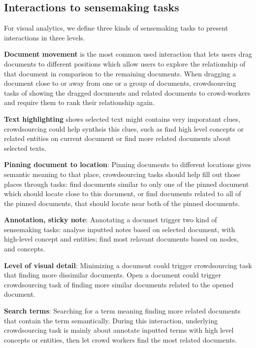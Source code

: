 \documentclass[journal]{vgtc}                %
\begin{document}
\subsection{Interactions to sensemaking tasks}

For visual analytics, we define three kinds of sensemaking tasks to present interactions in three levels.

\textbf{Document movement} is the most common used interaction that lets users drag documents to different positions which allow users to explore the relationship of that document in comparison to the remaining documents.  When dragging a document close to or away from one or a group of documents, crowdsourcing tasks of showing the dragged documents and related documents to crowd-workers and require them to rank their relationship again.

\textbf{Text highlighting} shows selected text might contains very imporatant clues, crowdsourcing could help synthsis this clues, such as find high level concepts or related entities on current document or find more related documents about selected texts.

\textbf{Pinning document to location}: Pinning documents to different locations gives semantic meaning to that place, crowdsourcing tasks should help fill out those places through tasks:  find documents similar to only one of the pinned document which should locate close to this document, or find documents related to all of the pinned documents, that should locate near both of the pinned documents.

\textbf{Annotation, sticky note}: Annotating a documet trigger two kind of sensemaking tasks: analyse inputted notes based on selected document, with high-level concept and entities; find most relavant documents based on nodes, and concepts.

\textbf{Level of visual detail}: Minimizing a document could trigger crowdsourcing task that finding more dissimilar documents. Open a document could trigger crowdsourcing task of finding more similar documents related to the opened document.

\textbf{Search terms}: Searching for a term meaning finding more related documents that contain the term semantically. During this interaction, underlying crowdsourcing task is mainly about annotate inputted terms with high level concepts or entities, then let crowd workers find the most related documents.



\end{document}
